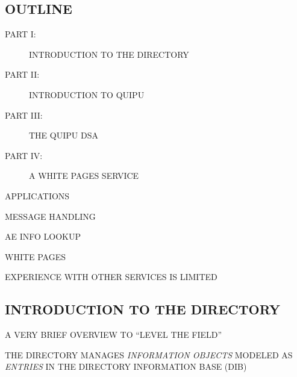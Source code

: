 

\begin{bwslide}
\part*	{OUTLINE}\bf

\begin{description}
\item[PART I:]		INTRODUCTION TO THE DIRECTORY

\item[PART II:]		INTRODUCTION TO QUIPU

\item[PART III:]	THE QUIPU DSA

\item[PART IV:]		A WHITE PAGES SERVICE
\end{description}
\end{bwslide}


\begin{bwslide}

\begin{nrtc}
\item	APPLICATIONS
    \begin{nrtc}
    \item	MESSAGE HANDLING

    \item	AE INFO LOOKUP

    \item	WHITE PAGES
    \end{nrtc}

\item	EXPERIENCE WITH OTHER SERVICES IS LIMITED
\end{nrtc}
\end{bwslide}


\begin{bwslide}
\part	{INTRODUCTION TO THE DIRECTORY}\bf

\begin{nrtc}
\item	A VERY BRIEF OVERVIEW TO ``LEVEL THE FIELD''

\item	THE DIRECTORY MANAGES \emph{INFORMATION OBJECTS} MODELED AS
	\emph{ENTRIES} IN THE DIRECTORY INFORMATION BASE (DIB)
\end{nrtc}
\end{bwslide}



